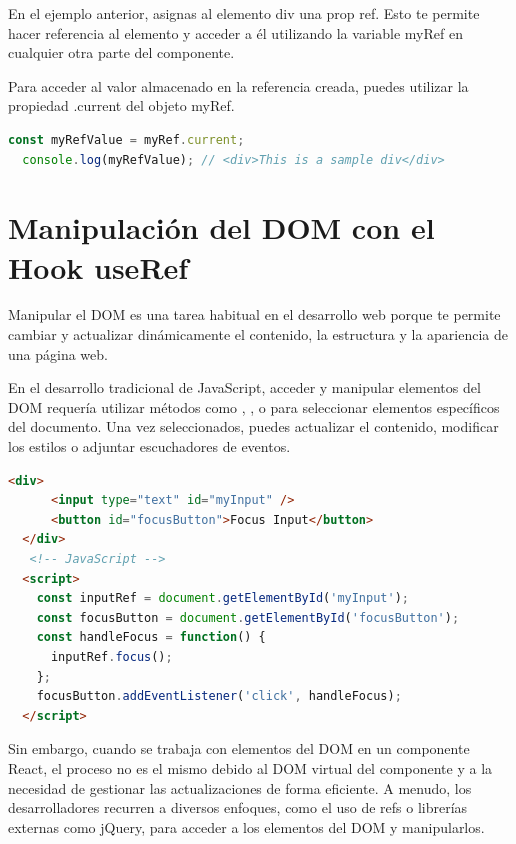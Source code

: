 En el ejemplo anterior, asignas al elemento div una prop ref. Esto te permite hacer referencia al elemento y acceder a él utilizando la variable myRef en cualquier otra parte del componente.

Para acceder al valor almacenado en la referencia creada, puedes utilizar la propiedad .current del objeto myRef.
\vspace{0.2cm} %

\begin{lstlisting}[language=TypeScript, style=mystyle]
  const myRefValue = myRef.current;
  console.log(myRefValue); // <div>This is a sample div</div>
\end{lstlisting}

\section*{Manipulación del DOM con el Hook useRef}

Manipular el DOM es una tarea habitual en el desarrollo web porque te permite cambiar y actualizar dinámicamente el contenido, la estructura y la apariencia de una página web.

En el desarrollo tradicional de JavaScript, acceder y manipular elementos del DOM requería utilizar métodos como , , o  para seleccionar elementos específicos del documento. Una vez seleccionados, puedes actualizar el contenido, modificar los estilos o adjuntar escuchadores de eventos.
\vspace{0.2cm} %

\begin{lstlisting}[language=HTML, style=mystyle]
  <div>
      <input type="text" id="myInput" />
      <button id="focusButton">Focus Input</button>
  </div>
   <!-- JavaScript -->
  <script>
    const inputRef = document.getElementById('myInput');
    const focusButton = document.getElementById('focusButton');
    const handleFocus = function() {
      inputRef.focus();
    };
    focusButton.addEventListener('click', handleFocus);
  </script>
\end{lstlisting}

Sin embargo, cuando se trabaja con elementos del DOM en un componente React, el proceso no es el mismo debido al DOM virtual del componente y a la necesidad de gestionar las actualizaciones de forma eficiente. A menudo, los desarrolladores recurren a diversos enfoques, como el uso de refs o librerías externas como jQuery, para acceder a los elementos del DOM y manipularlos.


